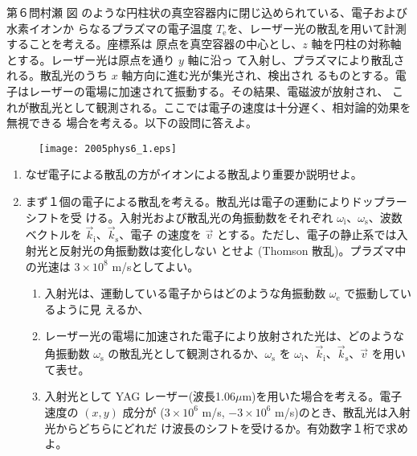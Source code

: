 \begin{question}{第６問}{村瀬}
図  のような円柱状の真空容器内に閉じ込められている、電子および水素イオンか
らなるプラズマの電子温度 $T_\mathrm{e}$を、レーザー光の散乱を用いて計測することを考える。座標系は
原点を真空容器の中心とし、$z$ 軸を円柱の対称軸とする。レーザー光は原点を通り $y$ 軸に沿っ
て入射し、プラズマにより散乱される。散乱光のうち $x$ 軸方向に進む光が集光され、検出され
るものとする。電子はレーザーの電場に加速されて振動する。その結果、電磁波が放射され、
これが散乱光として観測される。ここでは電子の速度は十分遅く、相対論的効果を無視できる
場合を考える。以下の設問に答えよ。
\begin{figure}[b]
  \begin{center}
  \texttt{[image: 2005phys6\_1.eps]}
  \end{center}
  \caption{}
\end{figure}
\begin{enumerate}
\item
  なぜ電子による散乱の方がイオンによる散乱より重要か説明せよ。
\item
  まず１個の電子による散乱を考える。散乱光は電子の運動によりドップラーシフトを受
  ける。入射光および散乱光の角振動数をそれぞれ $\omega_\mathrm{i}$、$\omega_\mathrm{s}$、波数ベクトルを $\vec k_\mathrm{i}$、$\vec k_\mathrm{s}$、電子
  の速度を $\vec v$ とする。ただし、電子の静止系では入射光と反射光の角振動数は変化しない
  とせよ (Thomson 散乱)。プラズマ中の光速は $3\times10^8$ m/sとしてよい。
  \begin{enumerate}
  \item
    入射光は、運動している電子からはどのような角振動数 $\omega_\mathrm{e}$ で振動しているように見
    えるか、
  \item
    レーザー光の電場に加速された電子により放射された光は、どのような角振動数 $\omega_\mathrm{s}$
    の散乱光として観測されるか、$\omega_\mathrm{s}$ を $\omega_\mathrm{i}$、$\vec k_\mathrm{i}$、$\vec k_\mathrm{s}$、$\vec v$ を用いて表せ。
  \item
    入射光として YAG レーザー(波長1.06$\mu$m)を用いた場合を考える。電子速度の $(x, y)$
    成分が ($3\times10^6$ m/s, $-3\times10^6$ m/s)のとき、散乱光は入射光からどちらにどれだ
    け波長のシフトを受けるか。有効数字１桁で求めよ。
  \end{enumerate}

\end{enumerate}
\end{question}
